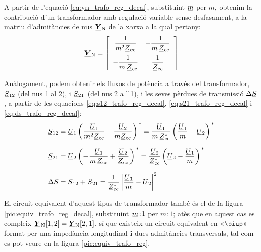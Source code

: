 A partir de l'equació  \eqref{eq:yn_trafo_reg_decal}, substituint
$\cmplx{m}$ per $m$, obtenim la contribució d'un transformador amb
regulació variable sense desfasament, a la matriu d'admitàncies de nus
$\mcmplx{Y}\ped{N}$ de la xarxa a la qual pertany:
\begin{equation}
   \mcmplx{Y}\ped{N} = 
   \begin{bmatrix}\begin{array}{cc} 
     \dfrac{1}{m^2 \cmplx{Z}\ped{cc}} & - \dfrac{1}{m \,\cmplx{Z}\ped{cc}} \\[2.5ex]
     - \dfrac{1}{m \,\cmplx{Z}\ped{cc}} & \dfrac{1}{\cmplx{Z}\ped{cc}}
   \end{array}\end{bmatrix}
\end{equation}

Anàlogament, podem obtenir els fluxos de potència a través del
transformador, $\cmplx{S}_{12}$ (del nus 1 al 2), i $\cmplx{S}_{21}$
(del nus 2 a l'1), i les seves pèrdues de transmissió
$\Delta\cmplx{S}$, a partir de les equacions
\eqref{eq:s12_trafo_reg_decal},  \eqref{eq:s21_trafo_reg_decal} i
\eqref{eq:ds_trafo_reg_decal}:  
\begin{align}
   \cmplx{S}_{12} &= \cmplx{U}_1 \left( \frac{\cmplx{U}_1}{m^2 \cmplx{Z}\ped{cc}} - \frac{\cmplx{U}_2}{m \cmplx{Z}\ped{cc}} \right)^{\,*} = \frac{\cmplx{U}_1}{m \,\cmplx{Z}\ped{cc}^*} \left( \frac{\cmplx{U}_1}{m} - \cmplx{U}_2 \right)^{\,*}  \\[1.5ex]
   \cmplx{S}_{21} &= \cmplx{U}_2 \left( - \frac{\cmplx{U}_1}{m \,\cmplx{Z}\ped{cc}} + \frac{\cmplx{U}_2} {\cmplx{Z}\ped{cc}} \right)^{\,*} = \frac{\cmplx{U}_2}{\cmplx{Z}\ped{cc}^*} \left(  \cmplx{U}_2 - \frac{\cmplx{U}_1}{m}  \right)^{\,*} \\[1.5ex]
 \Delta\cmplx{S} &= \cmplx{S}_{12} + \cmplx{S}_{21} = \frac{1}{\cmplx{Z}\ped{cc}^*}  \left|
    \frac{\cmplx{U}_1}{m} - \cmplx{U}_2 \right|^2
\end{align}


El circuit equivalent d'aquest tipus de transformador també és el de la
 figura \vref{pic:equiv_trafo_reg_decal}, substituint $\cmplx{m}\!:\!1$ per $m\!:\!1$;  atès que en aquest cas es compleix $\mcmplx{Y}\ped{N}[1,2] = \mcmplx{Y}\ped{N}[2,1]$, sí que
 existeix un circuit equivalent en «$\piup$» format per una impedància longitudinal i dues admitàncies transversals, tal com es pot veure en la figura  \vref{pic:equiv_trafo_reg}.

